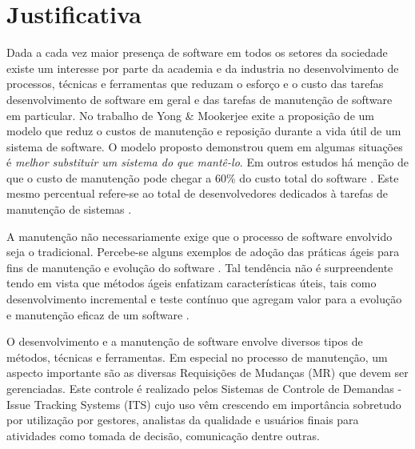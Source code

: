 \documentclass[msc,proposal,hidelot,hideabstract]{ppgccufmg} %
\begin{document}

\chapter{Justificativa}
\label{ch:justificativa}
Dada a cada vez maior presença de software em todos os setores da sociedade
existe um interesse por parte da academia e da industria no desenvolvimento de
processos, técnicas e ferramentas que reduzam o esforço e o custo das tarefas
desenvolvimento de software em geral e das tarefas de manutenção de software em
particular. No trabalho de Yong \& Mookerjee \cite{1423995}  exite a proposição
de um modelo que reduz o custos de manutenção e reposição durante a vida útil de um sistema de software. O modelo
proposto demonstrou quem em algumas situações é \textit{melhor substituir um
  sistema do que mantê-lo}. Em outros estudos há menção de que o custo de
manutenção pode chegar a 60\% do custo total do software \cite{kaur2015review}. Este mesmo percentual
refere-se ao total de desenvolvedores dedicados à tarefas de manutenção de
sistemas \cite{Zhang_2003}.

A manutenção não necessariamente exige que o processo de software envolvido
seja o tradicional. Percebe-se alguns exemplos de adoção das práticas ágeis
para fins de manutenção e evolução do software \cite{kajko2009model}. Tal
tendência não é surpreendente tendo em vista que métodos ágeis enfatizam
características úteis, tais como desenvolvimento incremental e teste contínuo
que agregam valor para a evolução e manutenção eficaz de um software
\cite{thomas2006agile}.

O desenvolvimento e a manutenção de software envolve diversos tipos de métodos,
técnicas e ferramentas. Em especial no processo de manutenção, um aspecto
importante são as diversas Requisições de Mudanças (MR) que devem ser
gerenciadas. Este controle é realizado pelos Sistemas de Controle de Demandas -
Issue Tracking Systems (ITS) cujo uso vêm crescendo em importância sobretudo
por utilização por gestores, analistas da qualidade e usuários finais para
atividades como tomada de decisão, comunicação dentre outras.
\end{document}
